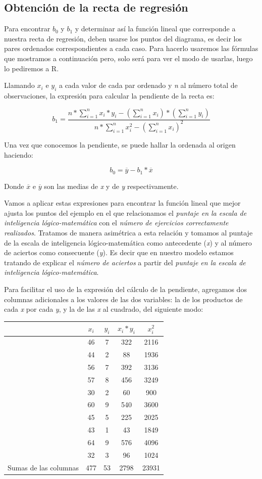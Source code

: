 \documentclass[]{book}
\begin{document}
\hypertarget{obtencion-de-la-recta-de-regresion}{%
\subsection{Obtención de la recta de regresión}\label{obtencion-de-la-recta-de-regresion}}

Para encontrar \(b_{0}\) y \(b_{1}\) y determinar así la función lineal que
corresponde a nuestra recta de regresión, deben usarse los puntos del
diagrama, es decir los pares ordenados correspondientes a cada caso.
Para hacerlo usaremos las fórmulas que mostramos a continuación pero,
solo será para ver el modo de usarlas, luego lo pediremos a R.

Llamando \(x_i\) e \(y_i\) a cada valor de cada par ordenado y
\emph{n} al número total de observaciones, la expresión para calcular la
pendiente de la recta es:

\[b_1=\frac{n*\sum_{i=1}^{n}{x_i*y_i}-(\sum_{i=1}^{n}x_i)*(\sum_{i=1}^{n}y_i)}{n*\sum_{i=1}^{n}x_i^{2}-(\sum_{i=1}^{n}x_i )^{2}}\]

Una vez que conocemos la pendiente, se puede hallar la ordenada al
origen haciendo:

\[b_{0} = \overline{y} - b_{1}*\overline{x}\]

Donde \(\overline{x}\) e \(\overline{y}\) son las medias de \emph{x} y de \emph{y}
respectivamente.

Vamos a aplicar estas expresiones para encontrar la función lineal que mejor ajusta los puntos del ejemplo en el que relacionamos el \emph{puntaje en la escala de inteligencia lógico-matemática} con el \emph{número de ejercicios correctamente realizados}. Tratamos de manera asimétrica a esta relación y tomamos al puntaje de la escala de inteligencia lógico-matemática como antecedente (\emph{x}) y al número de aciertos como consecuente (\emph{y}). Es decir que en nuestro modelo estamos tratando de explicar el \emph{número de aciertos} a partir del \emph{puntaje en la escala de inteligencia lógico-matemática}.

Para facilitar el uso de la expresión del cálculo de la pendiente,
agregamos dos columnas adicionales a los valores de las dos variables: la de los productos de cada \emph{x} por cada \emph{y}, y la de las \emph{x} al cuadrado, del siguiente modo:

\begin{longtable}[]{@{}lcccc@{}}
\toprule
& \(x_i\) & \(y_i\) & \(x_i*y_i\) & \(x_i^2\)\tabularnewline
\midrule
\endhead
& 46 & 7 & 322 & 2116\tabularnewline
& 44 & 2 & 88 & 1936\tabularnewline
& 56 & 7 & 392 & 3136\tabularnewline
& 57 & 8 & 456 & 3249\tabularnewline
& 30 & 2 & 60 & 900\tabularnewline
& 60 & 9 & 540 & 3600\tabularnewline
& 45 & 5 & 225 & 2025\tabularnewline
& 43 & 1 & 43 & 1849\tabularnewline
& 64 & 9 & 576 & 4096\tabularnewline
& 32 & 3 & 96 & 1024\tabularnewline
Sumas de las columnas & 477 & 53 & 2798 & 23931\tabularnewline
\bottomrule
\end{longtable}
\end{document}
